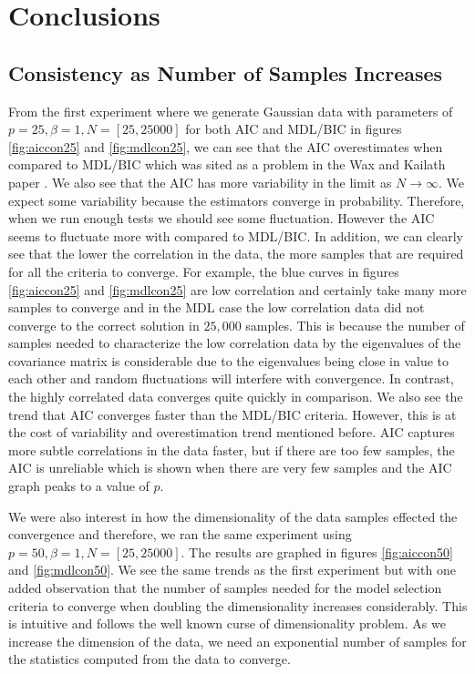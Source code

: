 \documentclass[journal]{IEEEtran}
\begin{document}
\section{Conclusions}
\subsection{Consistency as Number of Samples Increases}
\par From the first experiment where we generate Gaussian data with parameters of \(p = 25, \beta = 1, N = [25, 25000]\) for both AIC and MDL/BIC in figures \ref{fig:aiccon25} and \ref{fig:mdlcon25}, we can see that the AIC overestimates when compared to MDL/BIC which was sited as a problem in the Wax and Kailath paper \cite{wax}. We also see that the AIC has more variability in the limit as \(N \to \infty\). We expect some variability because the estimators converge in probability. Therefore, when we run enough tests we should see some fluctuation. However the AIC seems to fluctuate more with compared to MDL/BIC. In addition, we can clearly see that the lower the correlation in the data, the more samples that are required for all the criteria to converge. For example, the blue curves in figures \ref{fig:aiccon25} and \ref{fig:mdlcon25} are low correlation and certainly take many more samples to converge and in the MDL case the low correlation data did not converge to the correct solution in \(25,000\) samples. This is because the number of samples needed to characterize the low correlation data by the eigenvalues of the covariance matrix is considerable due to the eigenvalues being close in value to each other and random fluctuations will interfere with convergence. In contrast, the highly correlated data converges quite quickly in comparison. We also see the trend that AIC converges faster than the MDL/BIC criteria. However, this is at the cost of variability and overestimation trend mentioned before. AIC captures more subtle correlations in the data faster, but if there are too few samples, the AIC is unreliable which is shown when there are very few samples and the AIC graph peaks to a value of \(p\).
\par We were also interest in how the dimensionality of the data samples effected the convergence and therefore, we ran the same experiment using \(p = 50, \beta = 1, N = [25, 25000]\). The results are graphed in figures \ref{fig:aiccon50} and \ref{fig:mdlcon50}. We see the same trends as the first experiment but with one added observation that the number of samples needed for the model selection criteria to converge when doubling the dimensionality increases considerably. This is intuitive and follows the well known curse of dimensionality problem. As we increase the dimension of the data, we need an exponential number of samples for the statistics computed from the data to converge.
\end{document}
